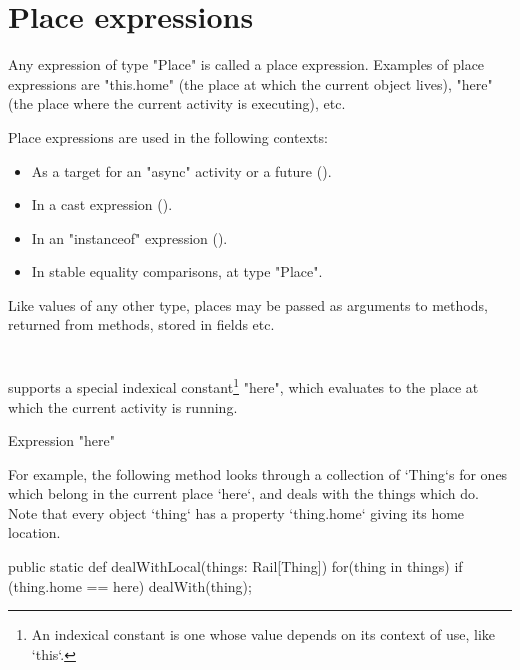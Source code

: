 \section{Place expressions}
Any expression of type \xcd"Place" is called a place expression. 
Examples of place expressions are \xcd"this.home" (the place
at which the current object lives), \xcd"here"
(the place where the current activity is executing), etc.

Place expressions are used in the following contexts: 
\begin{itemize}
\item As a target for an \xcd"async" activity or a future
().
\item In a cast expression ().
\item In an \xcd"instanceof" expression ().
\item In stable equality comparisons, at type \xcd"Place".
\end{itemize}

Like values of any other type, places may be passed as arguments
to methods, returned from methods, stored in fields etc.

\section{}\label{Here}
\Xten{} supports a special indexical constant\footnote{ An indexical constant
  is one whose value depends on its context of use, like \xcd`this`.}
\xcd"here", which evaluates to the place at which the current activity is
running.

\begin{grammar}
Expression \: \xcd"here" \\
\end{grammar}

\begin{example}
For example, the following method looks through a collection of \xcd`Thing`s
for ones which belong in the current place \xcd`here`, and deals with the
things which do.  Note that every object \xcd`thing` has a property
\xcd`thing.home` giving its home location.
\begin{xten}
  public static def dealWithLocal(things: Rail[Thing]) {
     for(thing in things) {
    	 if (thing.home == here) 
            dealWith(thing);
     }	  
  }
\end{xten}



\end{example}

